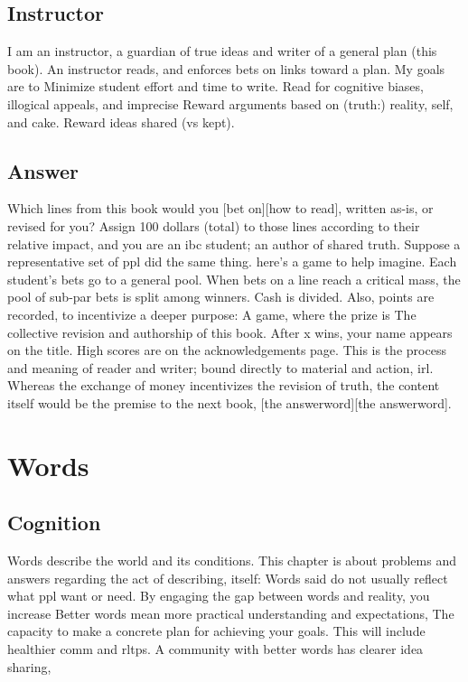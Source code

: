\documentclass[
]{book}
\begin{document}
\hypertarget{instructor}{%
\section{Instructor}\label{instructor}}

I am an instructor, a guardian of true ideas and writer of a general plan (this book).
An instructor reads, and enforces bets on links toward a plan.
My goals are to
Minimize student effort and time to write.
Read for cognitive biases, illogical appeals, and imprecise
Reward arguments based on (truth:) reality, self, and cake.
Reward ideas shared (vs kept).

\hypertarget{answer}{%
\section{Answer}\label{answer}}

Which lines from this book would you {[}bet on{]}{[}how to read{]}, written as-is, or revised for you?
Assign 100 dollars (total) to those lines according to their relative impact, and you are an ibc student; an author of shared truth.
Suppose a representative set of ppl did the same thing. here's a game to help imagine.
Each student's bets go to a general pool.
When bets on a line reach a critical mass, the pool of sub-par bets is split among winners.
Cash is divided.
Also, points are recorded, to incentivize a deeper purpose:
A game, where the prize is
The collective revision and authorship of this book.
After x wins, your name appears on the title.
High scores are on the acknowledgements page.
This is the process and meaning of reader and writer; bound directly to material and action, irl.
Whereas the exchange of money incentivizes the revision of truth, the content itself would be the premise to the next book, {[}the answerword{]}{[}the answerword{]}.

\hypertarget{words}{%
\chapter{Words}\label{words}}

\hypertarget{cognition}{%
\section{Cognition}\label{cognition}}

Words describe the world and its conditions.
This chapter is about problems and answers regarding the act of describing, itself:
Words said do not usually reflect what ppl want or need.
By engaging the gap between words and reality, you increase
Better words mean more practical understanding and expectations,
The capacity to make a concrete plan for achieving your goals.
This will include healthier comm and rltps.
A community with better words has clearer idea sharing,
\end{document}
